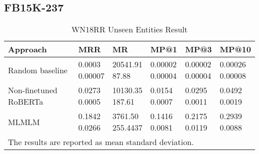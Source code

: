 \documentclass[11pt,a4paper]{article}
\newcommand{\TableW}[3]{\begin{table*}[h!]
\begin{center}
  \caption{#3} 
  \vspace{-0.25\baselineskip}
  \label{#2}
  #1
\end{center}
\end{table*}}
\begin{document}
\subsection{FB15K-237}
\TableW{\begin{tabular}{m{}m{}m{0.1\textwidth}m{0.1\textwidth}m{0.1\textwidth}m{0.1\textwidth}}
    \toprule
    Approach & MRR  & MR  & MP@1  & MP@3  & MP@10 \\
    \midrule 
Random baseline & 
        \shortstack[l]{{0.0003}\\{\small 0.00007}} &
        \shortstack[l]{{20541.91}\\{\small 87.88}} &
        \shortstack[l]{{0.00002}\\{\small 0.00004}} &
        \shortstack[l]{{0.00002}\\{\small 0.00004}} &
        \shortstack[l]{{0.00026}\\{\small 0.00008}}\\
    Non-finetuned RoBERTa & 
        \shortstack[l]{{0.0273}\\{\small 0.0005}} &
        \shortstack[l]{{10130.35}\\{\small 187.61}} &
        \shortstack[l]{{0.0154}\\{\small 0.0007}} &
        \shortstack[l]{{0.0295}\\{\small 0.0011}} &
        \shortstack[l]{{0.0492}\\{\small 0.0019}}\\
    MLMLM & 
        \shortstack[l]{{0.1842}\\{\small 0.0266}} &
        \shortstack[l]{{3761.50}\\{\small 255.4437}} &
        \shortstack[l]{{0.1416}\\{\small 0.0081}} &
        \shortstack[l]{{0.2175}\\{\small 0.0119}} &
        \shortstack[l]{{0.2939}\\{\small 0.0088}}\\
    \bottomrule
    \multicolumn{6}{p{.8\textwidth}}{\small The results are reported as mean  standard deviation.}

  \end{tabular}}
{tab:results3}
{WN18RR Unseen Entities Result}
\end{document}
